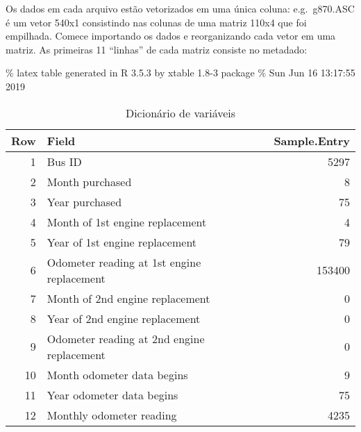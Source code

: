\documentclass[12pt,a4paper]{article}
\newenvironment{Shaded}{\begin{snugshade}}{\end{snugshade}}
\newcommand{\CommentTok}[1]{\textcolor[rgb]{0.56,0.35,0.01}{\textit{#1}}}
\newcommand{\DataTypeTok}[1]{\textcolor[rgb]{0.13,0.29,0.53}{#1}}
\newcommand{\DecValTok}[1]{\textcolor[rgb]{0.00,0.00,0.81}{#1}}
\newcommand{\KeywordTok}[1]{\textcolor[rgb]{0.13,0.29,0.53}{\textbf{#1}}}
\newcommand{\NormalTok}[1]{#1}
\newcommand{\OperatorTok}[1]{\textcolor[rgb]{0.81,0.36,0.00}{\textbf{#1}}}
\newcommand{\StringTok}[1]{\textcolor[rgb]{0.31,0.60,0.02}{#1}}
\begin{document}
Os dados em cada arquivo estão vetorizados em uma única coluna:
e.g.~g870.ASC é um vetor 540x1 consistindo nas colunas de uma matriz
110x4 que foi empilhada. Comece importando os dados e reorganizando cada
vetor em uma matriz. As primeiras 11 ``linhas'' de cada matriz consiste
no metadado:

\begin{Shaded}
\end{Shaded}

\% latex table generated in R 3.5.3 by xtable 1.8-3 package \% Sun Jun
16 13:17:55 2019

\begin{table}[ht]
\centering
\begin{tabular}{rlr}
  \hline
Row & Field & Sample.Entry \\ 
  \hline
1 & Bus ID & 5297 \\ 
  2 & Month purchased & 8 \\ 
  3 & Year purchased & 75 \\ 
  4 & Month of 1st engine replacement & 4 \\ 
  5 & Year of 1st engine replacement & 79 \\ 
  6 & Odometer reading at 1st engine replacement & 153400 \\ 
  7 & Month of 2nd engine replacement & 0 \\ 
  8 & Year of 2nd engine replacement & 0 \\ 
  9 & Odometer reading at 2nd engine replacement & 0 \\ 
  10 & Month odometer data begins & 9 \\ 
  11 & Year odometer data begins & 75 \\ 
  12 & Monthly odometer reading & 4235 \\ 
   \hline
\end{tabular}
\caption{Dicionário de variáveis} 
\end{table}
\end{document}
